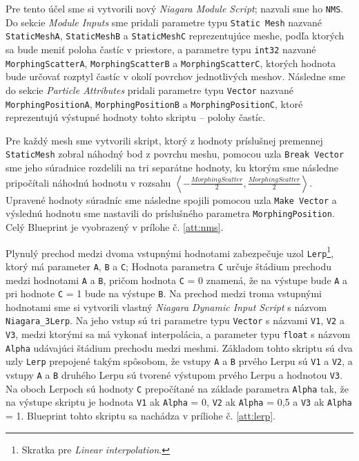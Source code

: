 Pre tento účel sme si vytvorili nový \emph{Niagara Module Script}; nazvali sme ho \texttt{NMS}. Do sekcie \emph{Module Inputs} sme pridali parametre typu \texttt{Static Mesh} nazvané \texttt{StaticMeshA}, \texttt{StaticMeshB} a 
\texttt{StaticMeshC} reprezentujúce meshe, podľa ktorých sa bude meniť poloha častíc v priestore, a parametre typu \texttt{int32} nazvané \texttt{MorphingScatterA}, \texttt{MorphingScatterB} a \texttt{MorphingScatterC},
ktorých hodnota bude určovať rozptyl častíc v okolí povrchov jednotlivých meshov. Následne sme do sekcie \emph{Particle Attributes} pridali parametre typu \texttt{Vector} nazvané \texttt{MorphingPositionA}, 
\texttt{MorphingPositionB} a \texttt{MorphingPositionC}, ktoré reprezentujú výstupné hodnoty tohto skriptu {--} polohy častíc.

Pre každý mesh sme vytvorili skript, ktorý z hodnoty príslušnej premennej \texttt{StaticMesh} zobral náhodný bod z povrchu meshu, pomocou uzla \texttt{Break Vector} sme jeho súradnice rozdelili na tri 
separátne hodnoty, ku ktorým sme následne pripočítali náhodnú hodnotu v rozsahu \(\left<-\frac{MorphingScatter}{2}, \frac{MorphingScatter}{2}\right>\). Upravené hodnoty súradníc sme následne spojili pomocou uzla 
\texttt{Make Vector} a výslednú hodnotu sme nastavili do príslušného parametra \texttt{MorphingPosition}. Celý Blueprint je vyobrazený v prílohe č. \ref{att:nms}.

Plynulý prechod medzi dvoma vstupnými hodnotami zabezpečuje uzol \texttt{Lerp}\footnote{Skratka pre \emph{Linear interpolation}.}, ktorý má parameter \texttt{A}, \texttt{B} a \texttt{C};
Hodnota parametra \texttt{C} určuje štádium prechodu medzi hodnotami \texttt{A} a \texttt{B}, pričom hodnota \texttt{C} = 0 znamená, že na výstupe bude \texttt{A} a pri hodnote \texttt{C} = 1 bude na výstupe \texttt{B}.
Na prechod medzi troma vstupnými hodnotami sme si vytvorili vlastný \emph{Niagara Dynamic Input Script} s názvom \texttt{Niagara\_3Lerp}. Na jeho vstup sú tri parametre typu \texttt{Vector} s názvami \texttt{V1}, 
\texttt{V2} a \texttt{V3}, medzi ktorými sa má vykonať interpolácia, a parameter typu \texttt{float} s názvom \texttt{Alpha} udávajúci štádium prechodu medzi meshmi. Základom tohto skriptu sú dva uzly \texttt{Lerp} 
prepojené takým spôsobom, že vstupy \texttt{A} a \texttt{B} prvého Lerpu sú \texttt{V1} a \texttt{V2}, a vstupy \texttt{A} a \texttt{B} druhého Lerpu sú tvorené výstupom prvého Lerpu a hodnotou \texttt{V3}.
Na oboch Lerpoch sú hodnoty \texttt{C} prepočítané na základe parametra \texttt{Alpha} tak, že na výstupe skriptu je hodnota \texttt{V1} ak \texttt{Alpha} = 0, \texttt{V2} ak \texttt{Alpha} = 0,5 a \texttt{V3} 
ak \texttt{Alpha} = 1. Blueprint tohto skriptu sa nachádza v príliohe č. \ref{att:lerp}.

